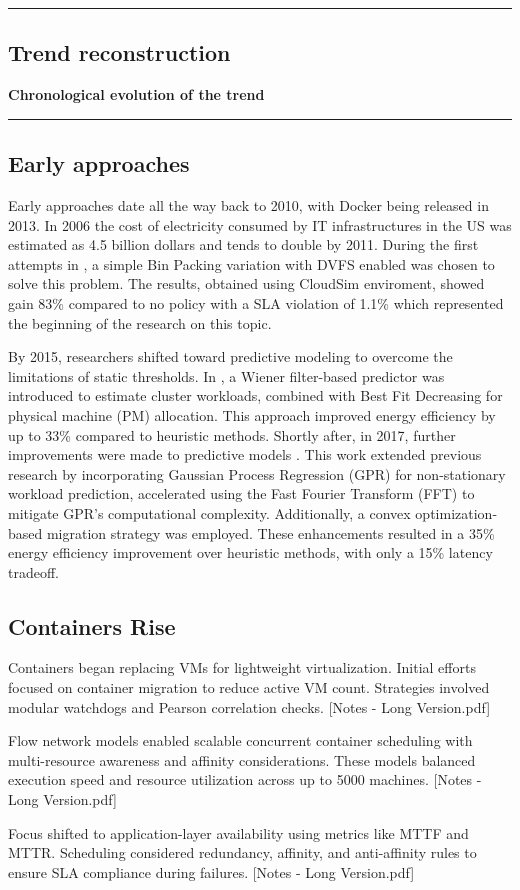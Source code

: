 {\color{gray}\hrule}
\begin{center}
\section{Trend reconstruction}
\textbf{Chronological evolution of the trend}
\bigskip
\end{center}
{\color{gray}\hrule}
\begin{multicols}{2}
\subsection{Early approaches}
Early approaches date all the way back to 2010, with Docker being released in 2013. In 2006 the cost of electricity consumed by IT infrastructures in the US was estimated as 4.5 billion dollars and tends to double by 2011\cite{beloglazov_energy_2010}.
During the first attempts in \cite{beloglazov_energy_2010}, a simple Bin Packing variation with DVFS enabled was chosen to solve this problem. The results, obtained using CloudSim enviroment, showed  gain 83\% compared to no policy with a SLA violation of 1.1\% which represented the beginning of the research on this topic.

By 2015, researchers shifted toward predictive modeling to overcome the limitations of static thresholds. In \cite{dabbagh_energy-efficient_2015}, a Wiener filter-based predictor was introduced to estimate cluster workloads, combined with Best Fit Decreasing for physical machine (PM) allocation. This approach improved energy efficiency by up to 33\% compared to heuristic methods.
Shortly after, in 2017, further improvements were made to predictive models \cite{bui_energy_2017}. This work extended previous research by incorporating Gaussian Process Regression (GPR) for non-stationary workload prediction, accelerated using the Fast Fourier Transform (FFT) to mitigate GPR's computational complexity. Additionally, a convex optimization-based migration strategy was employed. These enhancements resulted in a 35\% energy efficiency improvement over heuristic methods, with only a 15\% latency tradeoff.

\subsection{Containers Rise}
Containers began replacing VMs for lightweight virtualization. Initial efforts focused on container migration to reduce active VM count. Strategies involved modular watchdogs and Pearson correlation checks. [Notes - Long Version.pdf]

Flow network models enabled scalable concurrent container scheduling with multi-resource awareness and affinity considerations. These models balanced execution speed and resource utilization across up to 5000 machines. [Notes - Long Version.pdf]


Focus shifted to application-layer availability using metrics like MTTF and MTTR. Scheduling considered redundancy, affinity, and anti-affinity rules to ensure SLA compliance during failures. [Notes - Long Version.pdf]

\end{multicols}


